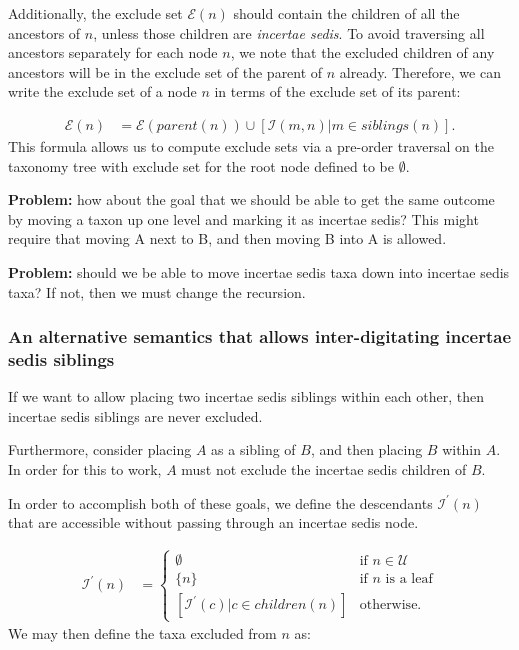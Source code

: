 \documentclass[english]{article}
\begin{document}
Additionally, the exclude set $\mathcal{E}(n)$ should contain the
children of all the ancestors of $n$, unless those children are
\emph{incertae sedis}. To avoid traversing all ancestors separately
for each node $n$, we note that the excluded children of any ancestors
will be in the exclude set of the parent of $n$ already. Therefore, we
can write the exclude set of a node $n$ in terms of the exclude set of
its parent:

\begin{align} \mathcal{E}(n) &
=\mathcal{E}(parent(n))\cup\left[\mathcal{I}(m,n)\big|m\in
siblings(n)\right].\label{eq:exclude-set-formula-1} \end{align} This
formula allows us to compute exclude sets via a pre-order traversal on
the taxonomy tree with exclude set for the root node defined to be
$\emptyset$.

\textbf{Problem:} how about the goal that we should be able to get the
same outcome by moving a taxon up one level and marking it as incertae
sedis? This might require that moving A next to B, and then moving B
into A is allowed.

\textbf{Problem:} should we be able to move incertae sedis taxa down
into incertae sedis taxa? If not, then we must change the recursion.

\subsubsection{An alternative semantics that allows inter-digitating
incertae sedis siblings}

If we want to allow placing two incertae sedis siblings within each
other, then incertae sedis siblings are never excluded.

Furthermore, consider placing $A$ as a sibling of $B$, and then
placing $B$ within $A$. In order for this to work, $A$ must not
exclude the incertae sedis children of $B$.

In order to accomplish both of these goals, we define the descendants
$\mathcal{I}^{\prime}(n)$ that are accessible without passing through
an incertae sedis node.

\begin{align*} \mathcal{I^{\prime}}(n) & =\begin{cases} \emptyset &
\text{if }n\in\mathcal{U}\\ \{n\} & \text{if }n\text{ is a leaf}\\{}
[\mathcal{I}^{\prime}(c)|c\in children(n)] & \text{otherwise.}
\end{cases} \end{align*} We may then define the taxa excluded from $n$
as:
\end{document}

